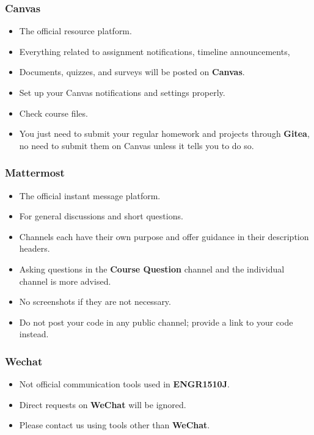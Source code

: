 \documentclass[
	11pt, %
]{beamer}
\begin{document}
\begin{frame}
	\frametitle{Canvas}
 
	\begin{itemize}
    \item The official resource platform.
    \item Everything related to assignment notifications, timeline announcements, 
    \item Documents, quizzes, and surveys will be posted on \textbf{Canvas}.
    \item Set up your Canvas notifications and settings properly.
    \item Check course files.
    \item You just need to submit your regular homework and projects through \textbf{Gitea}, no need to submit them on Canvas unless it tells you to do so.
\end{itemize}

\end{frame}


\begin{frame}
	\frametitle{Mattermost}
 
	\begin{itemize}
    \item The official instant message platform.
    \item For general discussions and short questions.
    \item Channels each have their own purpose and offer guidance in their description headers.
    \item Asking questions in the \textbf{Course Question} channel and the individual channel is more advised.
    \item No screenshots if they are not necessary.
    \item Do not post your code in any public channel; provide a link to your code instead.
\end{itemize}

\end{frame}


\begin{frame}
	\frametitle{Wechat}
 
	\begin{itemize}
    \item Not official communication tools used in \textbf{ENGR1510J}.
    \item Direct requests on \textbf{WeChat} will be ignored.
    \item Please contact us using tools other than \textbf{WeChat}.
\end{itemize}

\end{frame}
\end{document}
